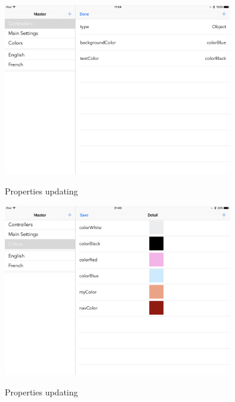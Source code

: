 \begin{figure}[h]
    \caption{Properties updating}
    \centering
    \includegraphics[width=100mm]{images/ipad-images/update}
    \label{fig:update-config}
\end{figure}


\begin{figure}[!h]
    \caption{Properties updating}
    \centering
    \includegraphics[width=100mm]{images/ipad-images/color}
    \label{fig:config-color}
\end{figure}